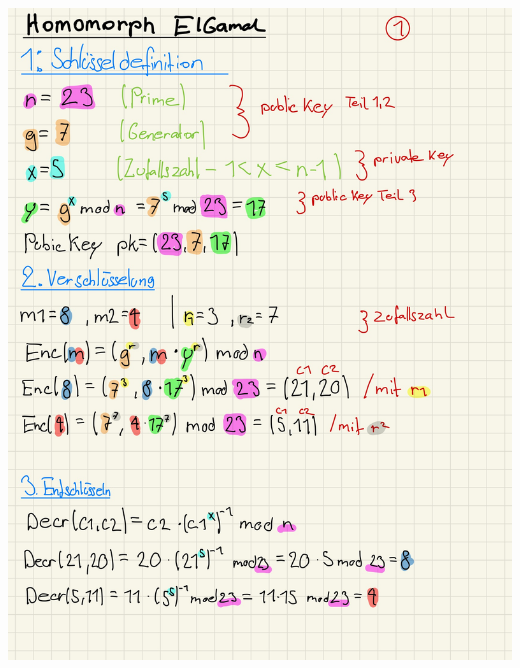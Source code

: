 \documentclass[11pt]{article}
\begin{document}
\begin{center}
	\includegraphics[scale=0.93]{img/helg1.jpg} \\
\end{center}

\break
\end{document}
